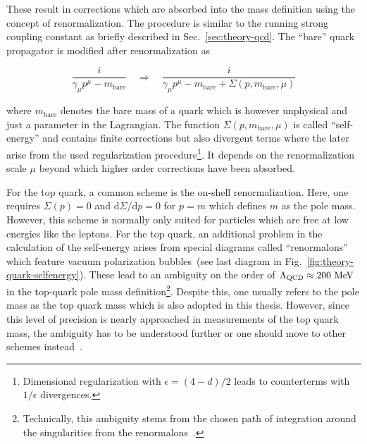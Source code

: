
These result in corrections which are absorbed into the mass definition using the concept of renormalization. The procedure is similar to the running strong coupling constant as briefly described in Sec.~\ref{sec:theory-qcd}. The ``bare'' quark propagator is modified after renormalization as

\begin{equation}
\frac{i}{\gamma_{\mu}p^{\mu}-m_\mathrm{bare}}\quad\Rightarrow\quad\frac{i}{\gamma_{\mu}p^{\mu}-m_\mathrm{bare}+\Sigma(p,m_\mathrm{bare},\mu)}
\end{equation}

where $m_\mathrm{bare}$ denotes the bare mass of a quark which is however unphysical and just a parameter in the Lagrangian. The function $\Sigma(p,m_\mathrm{bare},\mu)$ is called ``self-energy'' and contains finite corrections but also divergent terms where the later arise from the used regularization procedure\footnote{Dimensional regularization with $\epsilon=(4-d)/2$ leads to counterterms with $1/\epsilon$ divergences.}. It depends on the renormalization scale $\mu$ beyond which higher order corrections have been absorbed.

For the top quark, a common scheme is the on-shell renormalization. Here, one requires $\Sigma(p)=0$ and $\mathrm{d}\Sigma/\mathrm{d}p=0$ for $p=m$ which defines $m$ as the pole mass. However, this scheme is normally only suited for particles which are free at low energies like the leptons. For the top quark, an additional problem in the calculation of the self-energy arises from special diagrams called ``renormalons'' which feature vacuum polarization bubbles~(see last diagram in Fig.~\ref{fig:theory-quark-selfenergy}). These lead to an ambiguity on the order of $\Lambda_\mathrm{QCD}\approx200~\mathrm{MeV}$ in the top-quark pole mass definition\footnote{Technically, this ambiguity stems from the chosen path of integration around the singularities from the renormalons~\cite{Smith:1996xz}.}. Despite this, one usually refers to the pole mass as the top quark mass which is also adopted in this thesis. However, since this level of precision is nearly approached in measurements of the top quark mass, the ambiguity has to be understood further or one should move to other schemes instead~\cite{Smith:1996xz}.

